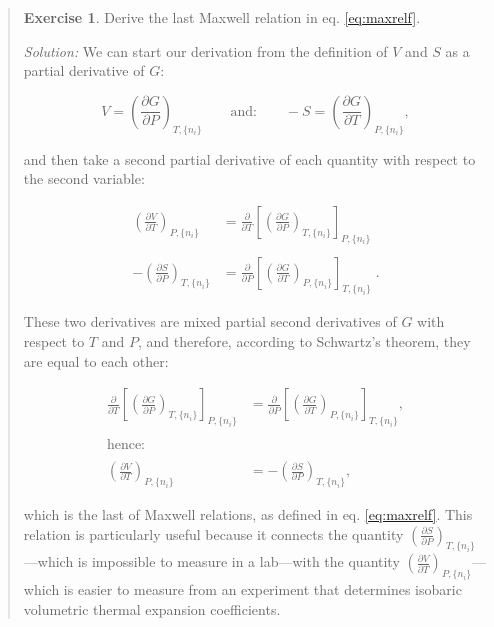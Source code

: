 \documentclass[
  9pt,
]{extbook}
\theoremstyle{definition}
\theoremstyle{definition}
\theoremstyle{definition}
\newtheorem{exercise}{Exercise}[chapter]
\theoremstyle{definition}
\theoremstyle{remark}
\begin{document}
\begin{quote}
\begin{exercise}
\protect\hypertarget{exr:maxwellEx}{}\label{exr:maxwellEx}Derive the last Maxwell relation in eq. \eqref{eq:maxrelf}.

\emph{Solution:} We can start our derivation from the definition of \(V\) and \(S\) as a partial derivative of \(G\):

\begin{equation}
 V = \left(\frac{\partial G}{\partial P} \right)_{T,\{n_i\}} \qquad \text{and:} \qquad -S = \left(\frac{\partial G}{\partial T} \right)_{P,\{n_i\}},
\end{equation}

and then take a second partial derivative of each quantity with respect to the second variable:

\begin{equation}
\begin{aligned}
 \left(\frac{\partial V}{\partial T} \right)_{P,\{n_i\}} &=\frac{\partial}{\partial T}\left[ \left(\frac{\partial G}{\partial P} \right)_{T,\{n_i\}} \right]_{P,\{n_i\}} \\
\\
-\left(\frac{\partial S}{\partial P} \right)_{T,\{n_i\}} &=\frac{\partial}{\partial P}\left[ \left(\frac{\partial G}{\partial T} \right)_{P,\{n_i\}} \right]_{T,\{n_i\}} \;.
\end{aligned}
\end{equation}

These two derivatives are mixed partial second derivatives of \(G\) with respect to \(T\) and \(P\), and therefore, according to Schwartz's theorem, they are equal to each other:

\begin{equation}
\begin{aligned}
\frac{\partial}{\partial T}\left[ \left(\frac{\partial G}{\partial P} \right)_{T,\{n_i\}} \right]_{P,\{n_i\}} &=
\frac{\partial}{\partial P}\left[ \left(\frac{\partial G}{\partial T} \right)_{P,\{n_i\}} \right]_{T,\{n_i\}}, \\
\\
\text{hence:} \\
\\
 \left(\frac{\partial V}{\partial T} \right)_{P,\{n_i\}} &= -\left(\frac{\partial S}{\partial P} \right)_{T,\{n_i\}},
\end{aligned}
\end{equation}

which is the last of Maxwell relations, as defined in eq. \eqref{eq:maxrelf}. This relation is particularly useful because it connects the quantity \(\left(\frac{\partial S}{\partial P} \right)_{T,\{n_i\}}\)---which is impossible to measure in a lab---with the quantity \(\left(\frac{\partial V}{\partial T} \right)_{P,\{n_i\}}\)---which is easier to measure from an experiment that determines isobaric volumetric thermal expansion coefficients.
\end{exercise}
\end{quote}
\end{document}
